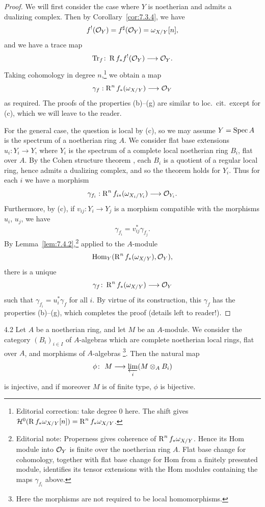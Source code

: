 \begin{proof}
We will first consider the case where $Y$ is noetherian and admits a dualizing complex. Then by Corollary~\ref{cor:7.3.4}, we have
\[
f^{!}(\mathcal{O}_{Y}) = f^{\sharp}(\mathcal{O}_{Y}) = \omega_{X/Y}[n],
\]
and we have a trace map
\[
\operatorname{Tr}_{f} \colon \operatorname{R} f_{*} f^{!}(\mathcal{O}_{Y}) \longrightarrow \mathcal{O}_{Y}.
\]
Taking cohomology in degree $n$,\footnote{Editorial correction: take degree $0$ here. The shift gives $\mathcal H^0(\operatorname{R} f_*\omega_{X/Y}[n])=\operatorname{R}^n f_*\omega_{X/Y}$.} we obtain a map
\[
\gamma_{f}: \operatorname{R}^{n} f_{*}(\omega_{X/Y}) \longrightarrow \mathcal{O}_{Y}
\]
as required. The proofs of the properties (b)--(g) are similar to loc.\ cit.\ except for (c), which we will leave to the reader.

For the general case, the question is local by (c), so we may assume $Y = \operatorname{Spec} A$ is the spectrum of a noetherian ring $A$. We consider flat base extensions $u_{i}: Y_{i} \to Y$, where $Y_{i}$ is the spectrum of a complete local noetherian ring $B_{i}$, flat over $A$. By the Cohen structure theorem \cite[\nopp (31.1)]{14}, each $B_{i}$ is a quotient of a regular local ring, hence admits a dualizing complex, and so the theorem holds for $Y_{i}$. Thus for each $i$ we have a morphism
\[
\gamma_{f_{i}}: \operatorname{R}^{n} f_{i*}(\omega_{X_{i}/Y_{i}}) \longrightarrow \mathcal{O}_{Y_{i}}.
\]
Furthermore, by (c), if $v_{ij}: Y_{i} \to Y_{j}$ is a morphism compatible with the morphisms $u_{i}$, $u_{j}$, we have
\[
\gamma_{f_{i}} = v_{ij}^{*} \gamma_{f_{j}}.
\]
By Lemma~\ref{lem:7.4.2},\footnote{Editorial note: Properness gives coherence of $\operatorname{R}^n f_*\omega_{X/Y}$. Hence its Hom module into $\mathcal{O}_Y$ is finite over the noetherian ring $A$. Flat base change for cohomology, together with flat base change for Hom from a finitely presented module, identifies its tensor extensions with the Hom modules containing the maps $\gamma_{f_i}$ above.} applied to the $A$-module
\[
\operatorname{Hom}_{Y}(\operatorname{R}^{n} f_{*}(\omega_{X/Y}), \mathcal{O}_{Y}),
\]
there is a unique
\[
\gamma_{f} \colon \operatorname{R}^{n} f_{*}(\omega_{X/Y}) \longrightarrow \mathcal{O}_{Y}
\]
such that $\gamma_{f_{i}} = u_{i}^{*} \gamma_{f}$ for all $i$. By virtue of its construction, this $\gamma_{f}$ has the properties (b)--(g), which completes the proof (details left to reader!).
\end{proof}

\begin{booklemma}{4.2}\label{lem:7.4.2}
Let $A$ be a noetherian ring, and let $M$ be an $A$-module. We consider the category $(B_{i})_{i \in I}$ of $A$-algebras which are complete noetherian local rings, flat over $A$, and morphisms of $A$-algebras \footnote{Here the morphisms are not required to be local homomorphisms.}. Then the natural map
\[
\phi\colon \ M \longrightarrow \varprojlim_i (M\otimes_A B_i)
\]
is injective, and if moreover $M$ is of finite type, $\phi$ is bijective.
\end{booklemma}

